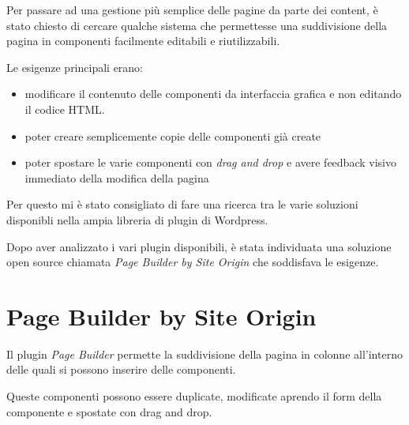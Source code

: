 


Per passare ad una gestione più semplice delle pagine da parte dei content,
 è stato chiesto di cercare qualche sistema che permettesse una suddivisione
della pagina in componenti facilmente editabili e riutilizzabili.

Le esigenze principali erano:
\begin{itemize}
\item modificare il contenuto delle componenti da interfaccia grafica e non 
editando il codice HTML.
\item poter creare semplicemente copie delle componenti già create
\item poter spostare le varie componenti con \emph{drag and drop} e avere
feedback visivo immediato della modifica della pagina
\end{itemize}

Per questo mi è stato consigliato di fare una ricerca tra le varie soluzioni disponibli
nella ampia libreria di plugin di Wordpress.


Dopo aver analizzato i vari plugin disponibili, è stata individuata una soluzione open source chiamata \emph{Page Builder by
Site Origin}\cite{PB} che soddisfava le esigenze.

\section{Page Builder by Site Origin}

Il plugin \emph{Page Builder} permette la suddivisione della pagina in colonne all'interno delle quali
si possono inserire delle componenti.

Queste componenti possono essere duplicate, modificate aprendo il form della componente e spostate
con drag and drop.


